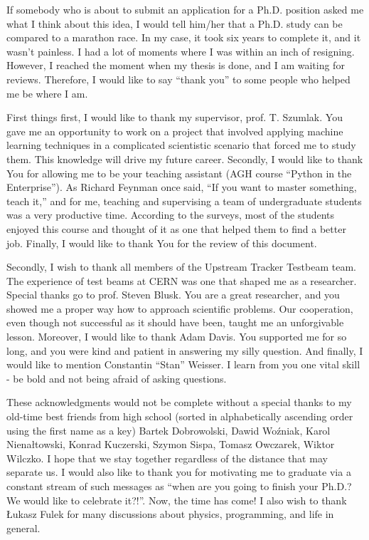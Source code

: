 
If somebody who is about to submit an application for a Ph.D. position asked me what I think about this idea, I would tell him/her that a Ph.D. study can be compared to a marathon race.  In my case, it took six years to complete it, and it wasn’t painless. I had a lot of moments where I was within an inch of resigning. However, I reached the moment when my thesis is done, and I am waiting for reviews. Therefore, I would like to say “thank you” to some people who helped me be where I am.
 
First things first, I would like to thank my supervisor, prof. T. Szumlak. You gave me an opportunity to work on a project that involved applying machine learning techniques in a complicated scientistic scenario that forced me to study them. This knowledge will drive my future career. Secondly, I would like to thank You for allowing me to be your teaching assistant (AGH course  “Python in the Enterprise”). As Richard Feynman once said, “If you want to master something, teach it,” and for me, teaching and supervising a team of undergraduate students was a very productive time. According to the surveys, most of the students enjoyed this course and thought of it as one that helped them to find a better job. Finally, I would like to thank You for the review of this document.  


Secondly, I wish to thank all members of the Upstream Tracker Testbeam team. The experience of test beams at CERN was one that shaped me as a researcher. 
Special thanks go to prof. Steven Blusk. You are a great researcher, and you showed me a proper way how to approach scientific problems. Our cooperation, even though not successful as it should have been, taught me an unforgivable lesson. Moreover, I would like to thank Adam Davis. You supported me for so long, and you were kind and patient in answering my silly question. And finally, I would like to mention Constantin “Stan” Weisser. I learn from you one vital skill -  be bold and not being afraid of asking questions. 


These acknowledgments would not be complete without a special thanks to my old-time best friends from high school (sorted in alphabetically ascending order using the first name as a key) Bartek Dobrowolski, Dawid Woźniak, Karol Nienałtowski, Konrad Kuczerski, Szymon Sispa, Tomasz Owczarek, Wiktor Wilczko. I hope that we stay together regardless of the distance that may separate us. I would also like to thank you for motivating me to graduate via a constant stream of such messages as “when are you going to finish your Ph.D.? We would like to celebrate it?!”. Now, the time has come! 
I also wish to thank Łukasz Fulek for many discussions about physics, programming, and life in general. 


